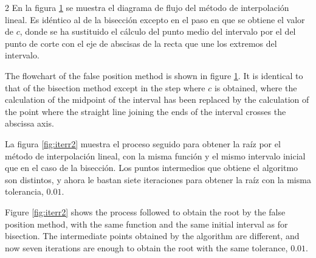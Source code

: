 \begin{figure}[h]
\begin{subfigure}{0.45\textwidth}
\end{subfigure}
\label{fig:regula}
\end{figure}

\begin{paracol}{2}
En la figura \ref{fig:regula} se muestra el diagrama de flujo del método de interpolación lineal. Es idéntico al de la bisección excepto en el paso en que se obtiene el valor de $c$, donde se ha sustituido el cálculo del punto medio del intervalo por el del punto de corte con el eje de abscisas de la recta que une los extremos del intervalo.

\switchcolumn
The flowchart of the false position method is shown in figure \ref{fig:regula}. It is identical to that of the bisection method except in the step where $c$ is obtained, where the calculation of the midpoint of the interval has been replaced by the calculation of the point where the straight line joining the ends of the interval crosses the abscissa axis.
\switchcolumn

La figura \ref{fig:iterr2} muestra el proceso seguido para obtener la raíz por el método de interpolación lineal, con la misma función y el mismo intervalo inicial que en el caso de la bisección. Los puntos intermedios que obtiene el algoritmo son distintos, y ahora le bastan siete iteraciones para obtener la raíz con la misma tolerancia, $0.01$.
\switchcolumn

Figure \ref{fig:iterr2} shows the process followed to obtain the root by the false position method, with the same function and the same initial interval as for bisection. The intermediate points obtained by the algorithm are different, and now seven iterations are enough to obtain the root with the same tolerance, $0.01$.
\end{paracol}

